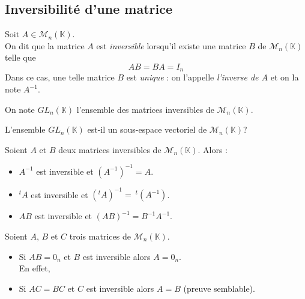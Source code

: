 \documentclass[a4paper,10pt]{report}
\begin{document}
\subsection{Inversibilité d'une matrice}
\begin{defip}
Soit $A \in \mathcal{M}_n(\mathbb{K})$.\\
On dit que la matrice $A$ est \textit{inversible} lorsqu'il existe une matrice $B$ de $\mathcal{M}_n(\mathbb{K})$ telle que
$$AB=BA=I_n$$
Dans ce cas, une telle matrice $B$ est \textit{unique} : on l'appelle \textit{l'inverse de $A$} et on la note $A^{-1}$.

\noindent On note $GL_{n}(\mathbb{K})$ l'ensemble des matrices inversibles de $\mathcal{M}_n(\mathbb{K})$.
\end{defip}
%

\begin{exa} L'ensemble $GL_{n}(\mathbb{K})$ est-il un sous-espace vectoriel de $\mathcal{M}_n(\mathbb{K})$?
\end{exa}


\begin{prop}
Soient $A$ et $B$ deux matrices inversibles de $\mathcal{M}_n(\mathbb{K})$. Alors : 
\begin{itemize}
\item $A^{-1}$ est inversible et $(A^{-1})^{-1}=A$.
\item $^tA$ est inversible et $(^tA)^{-1} = \ ^t(A^{-1})$.
\item $AB$ est inversible et $(AB)^{-1}=B^{-1}A^{-1}$.
\end{itemize}
\end{prop}




\begin{rem}
 Soient $A$, $B$ et $C$ trois matrices de $\mathcal{M}_n(\mathbb{K})$.
\begin{itemize}
\item Si $AB=0_n$ et $B$ est inversible alors $A=0_n$.\\
En effet, 
\item Si $AC=BC$ et $C$ est inversible alors $A=B$ (preuve semblable).
\end{itemize}
\end{rem}
\end{document}
